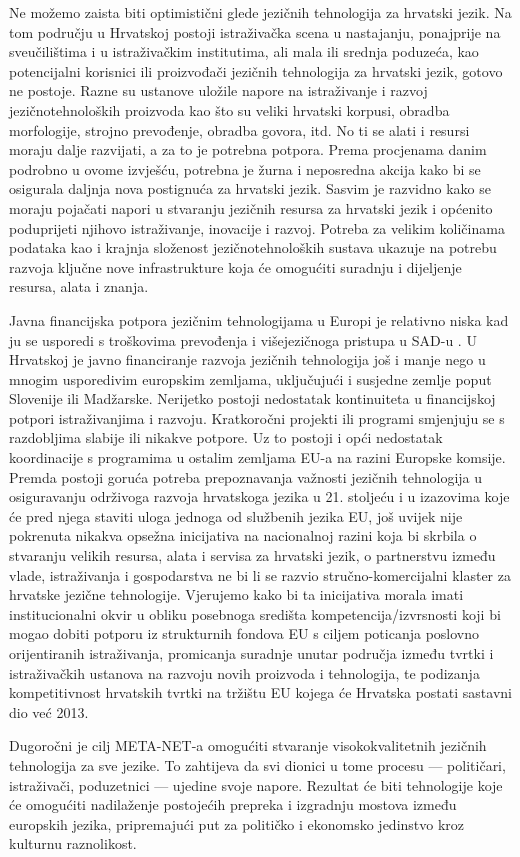 \begin{multicols}{2}
Ne možemo zaista biti optimistični glede jezičnih tehnologija za hrvatski jezik. Na tom području u Hrvatskoj postoji istraživačka scena u nastajanju, ponajprije na sveučilištima i u istraživačkim institutima, ali mala ili srednja poduzeća, kao potencijalni korisnici ili proizvođači jezičnih tehnologija za hrvatski jezik, gotovo ne postoje. Razne su ustanove uložile napore na istraživanje i razvoj jezičnotehnoloških proizvoda kao što su veliki hrvatski korpusi, obradba morfologije, strojno prevođenje, obradba govora, itd. No ti se alati i resursi moraju dalje razvijati, a za to je potrebna potpora. Prema procjenama danim podrobno u ovome izvješću, potrebna je žurna i neposredna akcija kako bi se osigurala daljnja nova postignuća za hrvatski jezik. Sasvim je razvidno kako se moraju pojačati napori u stvaranju jezičnih resursa za hrvatski jezik i općenito poduprijeti njihovo istraživanje, inovacije i razvoj. Potreba za velikim količinama podataka kao i krajnja složenost jezičnotehnoloških sustava ukazuje na potrebu razvoja ključne nove infrastrukture koja će omogućiti suradnju i dijeljenje resursa, alata i znanja.

Javna financijska potpora jezičnim tehnologijama u Europi je relativno niska kad ju se usporedi s troškovima prevođenja i višejezičnoga pristupa u SAD-u \cite{str36}. U Hrvatskoj je javno financiranje razvoja jezičnih tehnologija još i manje nego u mnogim usporedivim europskim zemljama, uključujući i susjedne zemlje poput Slovenije ili Madžarske. Nerijetko postoji nedostatak kontinuiteta u financijskoj potpori istraživanjima i razvoju. Kratkoročni projekti ili programi smjenjuju se s razdobljima slabije ili nikakve potpore. Uz to postoji i opći nedostatak koordinacije s programima u ostalim zemljama EU-a na razini Europske komsije.
Premda postoji goruća potreba prepoznavanja važnosti jezičnih tehnologija u osiguravanju održivoga razvoja hrvatskoga jezika u 21. stoljeću i u izazovima koje će pred njega staviti uloga jednoga od službenih jezika EU, još uvijek nije pokrenuta nikakva opsežna inicijativa na nacionalnoj razini koja bi skrbila o stvaranju velikih resursa, alata i servisa za hrvatski jezik, o partnerstvu između vlade, istraživanja i gospodarstva ne bi li se razvio stručno-komercijalni klaster za hrvatske jezične tehnologije. Vjerujemo kako bi ta inicijativa morala imati institucionalni okvir u obliku posebnoga središta kompetencija/izvrsnosti koji bi mogao dobiti potporu iz strukturnih fondova EU s ciljem poticanja poslovno orijentiranih istraživanja, promicanja suradnje unutar područja između tvrtki i istraživačkih ustanova na razvoju novih proizvoda i tehnologija, te podizanja kompetitivnost hrvatskih tvrtki na tržištu EU kojega će Hrvatska postati sastavni dio već 2013.

Dugoročni je cilj META-NET-a omogućiti stvaranje visokokvalitetnih jezičnih tehnologija za sve jezike. To zahtijeva da svi dionici u tome procesu — političari, istraživači, poduzetnici — ujedine svoje napore. Rezultat će biti tehnologije koje će omogućiti nadilaženje postojećih prepreka i izgradnju mostova između europskih jezika, pripremajući put za političko i ekonomsko jedinstvo kroz kulturnu raznolikost.

\end{multicols}

